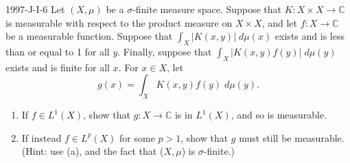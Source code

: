 \documentclass{article}
\begin{document}
	\begin{prb}{1997-J-I-6}
		Let $(X, \mu)$ be a $\sigma$-finite measure space. Suppose that $K: X \times X \to \mathbb{C}$ is measurable with respect to the product measure on $X \times X$, and let $f: X \to \mathbb{C}$ be a measurable function. Suppose that $\int_{X}|K(x,y)|\;d\mu(x)$ exists and is less than or equal to 1 for all $y$. Finally, suppose that $\int_{X}|K(x,y)f(y)|\;d\mu(y)$ exists and is finite for all $x$. For $x \in X$, let 
		\begin{equation*}
			g(x) = \int_{X}K(x,y)f(y)\;d\mu(y). 
		\end{equation*}
		\begin{enumerate}[itemsep =-2pt,label = (\alph{*})]
			\item If $f \in L^1(X)$, show that $g: X \to \mathbb{C}$ is in $L^1(X)$, and so is measurable. 
			\item If instead $f \in L^p(X)$ for some $p > 1$, show that $g$ must still be measurable. (Hint: use (a), and the fact that ($X, \mu$) is $\sigma$-finite.)
		\end{enumerate}
	\end{prb}
\end{document}
